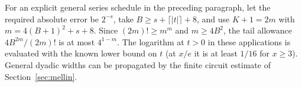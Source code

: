 For an explicit general series schedule in the preceding paragraph, let the required absolute error be $2^{-s}$, take $B\ge s+\lceil|t|\rceil+8$, and use $K+1=2m$ with $m=4(B+1)^2+s+8$. Since $(2m)!\ge m^m$ and $m\ge4B^2$, the tail allowance $4 B^{2m}/(2m)!$ is at most $4^{1-m}$. The logarithm at $t>0$ in these applications is evaluated with the known lower bound on $t$ (at $x/e$ it is at least $1/16$ for $x\ge3$). General dyadic widths can be propagated by the finite circuit estimate of Section~\ref{sec:mellin}.
